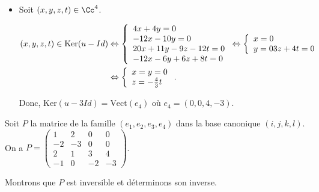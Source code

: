 {\begin{enumerate}
{\begin{itemize}
Donc, $\mbox{Ker}(u-2Id)=\mbox{Vect}(e_3)$ où $e_3=(0,0,3,-2)$.
\item[-Cas $\lambda=3$.]

Soit $(x,y,z,t)\in\Cc^4$.

\begin{align*}\ensuremath
(x,y,z,t)\in\mbox{Ker}(u-Id)&\Leftrightarrow\left\{
\begin{array}{l}
4x+4y=0\\
-12x-10y=0\\
20x+11y-9z-12t=0\\
-12x-6y+6z+8t=0
\end{array}
\right.\Leftrightarrow\left\{
\begin{array}{l}
x=0\\
y=0
3z+4t=0
\end{array}
\right.
\\
 &\Leftrightarrow\left\{
\begin{array}{l}
x=y=0\\
z=-\frac{4}{3}t
\end{array}
\right.
.
\end{align*}

Donc, $\mbox{Ker}(u-3Id)=\mbox{Vect}(e_4)$ où $e_4=(0,0,4,-3)$.

\end{itemize}

Soit $P$ la matrice de la famille $(e_1,e_2,e_3,e_4)$ dans la base canonique $(i,j,k,l)$. On a $P=\left(
\begin{array}{cccc}
1&2&0&0\\
-2&-3&0&0\\
2&1&3&4\\
-1&0&-2&-3
\end{array}
\right)$.

Montrons que $P$ est inversible et déterminons son inverse.

}
\end{enumerate}}
